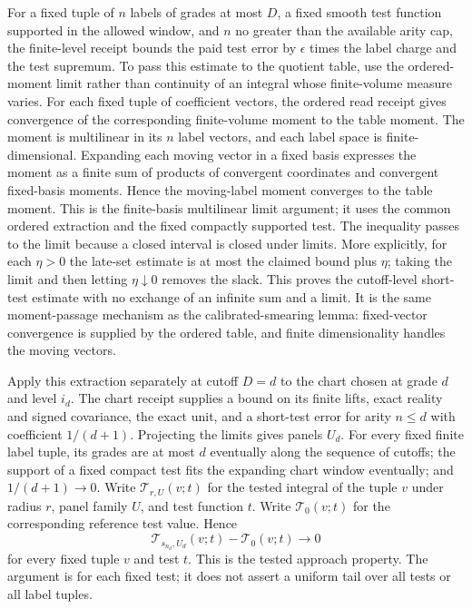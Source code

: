 For a fixed tuple of $n$ labels of grades at most $D$, a fixed smooth test
function supported in the allowed window, and $n$ no greater than the
available arity cap, the finite-level receipt bounds the paid test error
by $\epsilon$ times the label charge and the test supremum. To pass this
estimate to the quotient table, use the ordered-moment limit rather than
continuity of an integral whose finite-volume measure varies. For each
fixed tuple of coefficient vectors, the ordered read receipt gives
convergence of the corresponding finite-volume moment to the table moment.
The moment is multilinear in its $n$ label vectors, and each label space is
finite-dimensional. Expanding each moving vector in a fixed basis expresses
the moment as a finite sum of products of convergent coordinates and
convergent fixed-basis moments. Hence the moving-label moment converges to
the table moment. This is the finite-basis multilinear limit argument; it
uses the common ordered extraction and the fixed compactly supported test.
The inequality passes to the limit
because a closed interval is closed under limits. More explicitly, for
each $\eta>0$ the late-set estimate is at most the claimed bound plus
$\eta$; taking the limit and then letting $\eta\downarrow0$ removes the
slack. This proves the cutoff-level short-test estimate with no exchange
of an infinite sum and a limit. It is the same moment-passage mechanism as
the calibrated-smearing lemma: fixed-vector convergence is supplied by the
ordered table, and finite dimensionality handles the moving vectors.

Apply this extraction separately at cutoff $D=d$ to the chart chosen at
grade $d$ and level $i_d$. The chart receipt supplies a bound on its finite lifts,
exact reality and signed covariance, the exact unit, and a short-test error
for arity $n\leq d$ with coefficient $1/(d+1)$. Projecting the
limits gives panels $U_d$. For every fixed finite label tuple, its grades
are at most $d$ eventually along the sequence of cutoffs; the support of a
fixed compact test fits the expanding chart window eventually; and
$1/(d+1)\to0$. Write
$\mathcal T_{r,U}(v;t)$ for the tested integral of the tuple $v$ under
radius $r$, panel family $U$, and test function $t$. Write
$\mathcal T_0(v;t)$ for the corresponding reference test value. Hence
\[
 \mathcal T_{s_{n_d},U_d}(v;t)-\mathcal T_{0}(v;t)
 \longrightarrow0
\]
for every fixed tuple $v$ and test $t$. This is the tested approach property.
The argument is for each fixed test; it does not assert a uniform tail over
all tests or all label tuples.

